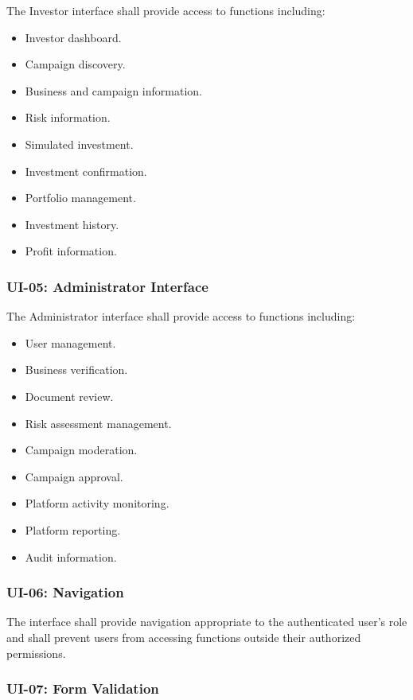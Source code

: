 The Investor interface shall provide access to functions including:

\begin{itemize}
    \item Investor dashboard.
    \item Campaign discovery.
    \item Business and campaign information.
    \item Risk information.
    \item Simulated investment.
    \item Investment confirmation.
    \item Portfolio management.
    \item Investment history.
    \item Profit information.
\end{itemize}

\subsubsection{UI-05: Administrator Interface}

The Administrator interface shall provide access to functions including:

\begin{itemize}
    \item User management.
    \item Business verification.
    \item Document review.
    \item Risk assessment management.
    \item Campaign moderation.
    \item Campaign approval.
    \item Platform activity monitoring.
    \item Platform reporting.
    \item Audit information.
\end{itemize}

\subsubsection{UI-06: Navigation}

The interface shall provide navigation appropriate to the authenticated
user's role and shall prevent users from accessing functions outside their
authorized permissions.

\subsubsection{UI-07: Form Validation}


